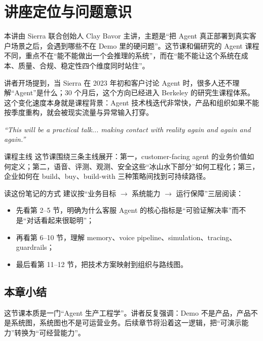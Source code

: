 \section{讲座定位与问题意识}

本讲由 Sierra 联合创始人 Clay Bavor 主讲，主题是“把 Agent 真正部署到真实客户场景之后，会遇到哪些不在 Demo 里的硬问题”。这节课和偏研究的 Agent 课程不同，重点不在“能不能做出一个会推理的系统”，而在“能不能让这个系统在成本、质量、合规、稳定性四个维度同时站住”。

讲者开场提到，当 Sierra 在 2023 年初和客户讨论 Agent 时，很多人还不理解“Agent”是什么；30 个月后，这个方向已经进入 Berkeley 的研究生课程体系。这个变化速度本身就是课程背景：Agent 技术栈迭代非常快，产品和组织如果不能按季度重构，就会被现实流量与异常输入打穿。

\textit{``This will be a practical talk... making contact with reality again and again and again.''}

\begin{knowledgebox}{课程主线}
这节课围绕三条主线展开：第一，customer-facing agent 的业务价值如何定义；第二，语音、评测、观测、安全这些“冰山水下部分”如何工程化；第三，企业如何在 build、buy、build-with 三种策略间找到可持续路径。
\end{knowledgebox}

\begin{importantbox}{读这份笔记的方式}
建议按“业务目标 $\rightarrow$ 系统能力 $\rightarrow$ 运行保障”三层阅读：
\begin{itemize}[leftmargin=1.5em]
    \item 先看第 2--5 节，明确为什么客服 Agent 的核心指标是“可验证解决率”而不是“对话看起来很聪明”；
    \item 再看第 6--10 节，理解 memory、voice pipeline、simulation、tracing、guardrails；
    \item 最后看第 11--12 节，把技术方案映射到组织与路线图。
\end{itemize}
\end{importantbox}

\subsection{本章小结}

这节课本质是一门“Agent 生产工程学”。讲者反复强调：Demo 不是产品，产品不是系统图，系统图也不是可运营业务。后续章节将沿着这一逻辑，把“可演示能力”转换为“可经营能力”。


